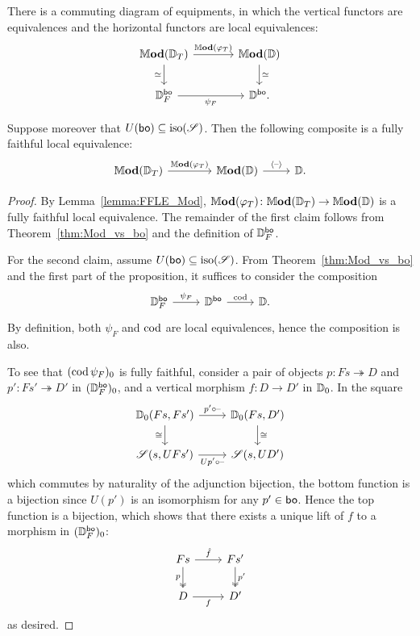 \documentclass[11pt,oneside,article]{memoir}
\begin{document}
\begin{proposition}
      \label{prop:objectfree_Mod_bo}
   There is a commuting diagram of equipments, in which the vertical functors are equivalences and the horizontal functors are local equivalences:
   \[ \begin{tikzcd}[column sep=large]
      \dMod(\dcat{D}_T) \ar[r,"\dMod(\varphi_T)"] \ar[d,"\equiv"']
         & \dMod(\dcat{D}) \ar[d,"\equiv"] \\
      \dcat{D}_F^{\bo} \ar[r,"\psi_F"'] & \dcat{D}^{\bo}.
   \end{tikzcd} \]

   Suppose moreover that $U(\mathsf{bo})\subseteq\mathrm{iso}(\mathscr{S})$. Then the following composite is a
   fully faithful local equivalence:
   \[ \begin{tikzcd}
      \dMod(\dcat{D}_T)\ar[r,"\dMod(\varphi_T)"] &[1.5em] \dMod(\dcat{D}) \ar[r,"\ColDash"] & \dcat{D}.
   \end{tikzcd} \]
\end{proposition}
\begin{proof}
   By Lemma~\ref{lemma:FFLE_Mod}, $\mathbb{M}\mathbf{od}(\varphi_T)\colon\mathbb{M}\mathbf{od}(\mathbb{D}_T)\to\mathbb{M}\mathbf{od}(\mathbb{D})$ is a fully faithful local equivalence. The remainder of the first claim follows from Theorem~\ref{thm:Mod_vs_bo} and the definition of $\mathbb{D}^{\mathsf{bo}}_F$.

   For the second claim, assume $U(\mathsf{bo})\subseteq\mathrm{iso}(\mathscr{S})$. From Theorem~\ref{thm:Mod_vs_bo} and the first part of the proposition, it suffices to consider the composition
   \[ \begin{tikzcd}
      \dcat{D}^{\bo}_F \ar[r,"\psi_F"] & \dcat{D}^{\bo} \ar[r,"\cod"] & \dcat{D}.
   \end{tikzcd} \]
   By definition, both $\psi_F$ and $\operatorname{cod}$ are local equivalences, hence the composition is also.

   To see that $(\operatorname{cod}\psi_F)_0$ is fully faithful, consider a pair of objects $p\colon
   Fs\twoheadrightarrow D$ and $p'\colon Fs'\twoheadrightarrow D'$ in $(\mathbb{D}_F^{\mathsf{bo}})_0$, and a
   vertical morphism $f\colon D\to D'$ in $\mathbb{D}_0$. In the square
   \[ \begin{tikzcd}
      \dcat{D}_0(Fs,Fs') \ar[r,"p'\circ\textrm{--}"] \ar[d,"\iso"']
         & \dcat{D}_0(Fs,D') \ar[d,"\iso"] \\
      \cat{S}(s,UFs') \ar[r,"Up'\circ\textrm{--}"']
         & \cat{S}(s,UD')
   \end{tikzcd} \]
   which commutes by naturality of the adjunction bijection, the bottom function is a bijection
   since $U(p')$ is an isomorphism for any $p'\in\mathsf{bo}$. Hence the top
   function is a bijection, which shows that there exists a unique lift of $f$ to a morphism in
   $(\mathbb{D}_F^{\mathsf{bo}})_0$:
   \[ \begin{tikzcd}
      Fs \ar[r,"\hat{f}"] \ar[d,two heads,"p"']
         & Fs' \ar[d,two heads,"p'"] \\
      D \ar[r,"f"'] & D'
   \end{tikzcd} \]
   as desired.
\end{proof}
\end{document}
